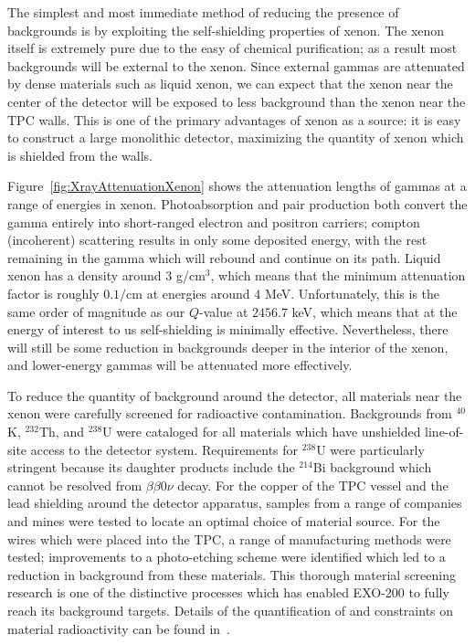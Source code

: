 The simplest and most immediate method of reducing the presence of backgrounds is by exploiting the self-shielding properties of xenon.  The xenon itself is extremely pure due to the easy of chemical purification; as a result most backgrounds will be external to the xenon.  Since external gammas are attenuated by dense materials such as liquid xenon, we can expect that the xenon near the center of the detector will be exposed to less background than the xenon near the TPC walls.  This is one of the primary advantages of xenon as a source: it is easy to construct a large monolithic detector, maximizing the quantity of xenon which is shielded from the walls.

Figure~\ref{fig:XrayAttenuationXenon} shows the attenuation lengths of gammas at a range of energies in xenon.  Photoabsorption and pair production both convert the gamma entirely into short-ranged electron and positron carriers; compton (incoherent) scattering results in only some deposited energy, with the rest remaining in the gamma which will rebound and continue on its path.  Liquid xenon has a density around $3$ g/cm$^3$, which means that the minimum attenuation factor is roughly $0.1/\text{cm}$ at energies around $4$ MeV.  Unfortunately, this is the same order of magnitude as our $Q$-value at $2456.7$ keV, which means that at the energy of interest to us self-shielding is minimally effective.  Nevertheless, there will still be some reduction in backgrounds deeper in the interior of the xenon, and lower-energy gammas will be attenuated more effectively.~\cite{XcomXenonAttenuation}

To reduce the quantity of background around the detector, all materials near the xenon were carefully screened for radioactive contamination.  Backgrounds from $^{40}$K, $^{232}$Th, and $^{238}$U were cataloged for all materials which have unshielded line-of-site access to the detector system.  Requirements for $^{238}$U were particularly stringent because its daughter products include the $^{214}$Bi background which cannot be resolved from $\beta\beta 0\nu$ decay.  For the copper of the TPC vessel and the lead shielding around the detector apparatus, samples from a range of companies and mines were tested to locate an optimal choice of material source.  For the wires which were placed into the TPC, a range of manufacturing methods were tested; improvements to a photo-etching scheme were identified which led to a reduction in background from these materials.  This thorough material screening research is one of the distinctive processes which has enabled EXO-200 to fully reach its background targets.  Details of the quantification of and constraints on material radioactivity can be found in~\cite{MaterialsCatalog}.

